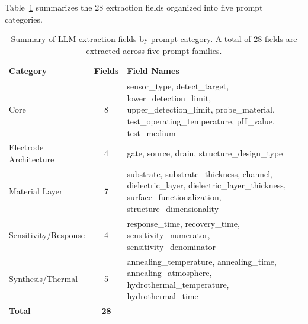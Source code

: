 Table~\ref{tab:extraction_fields} summarizes the 28 extraction fields organized into five prompt categories.

\begin{table}[htbp]
\centering
\caption{Summary of LLM extraction fields by prompt category. A total of 28 fields are extracted across five prompt families.}
\label{tab:extraction_fields}
\small
\begin{tabular}{lcp{12cm}}
\toprule
\textbf{Category} & \textbf{Fields} & \textbf{Field Names} \\
\midrule
Core & 8 & sensor\_type, detect\_target, lower\_detection\_limit, upper\_detection\_limit, probe\_material, test\_operating\_temperature, pH\_value, test\_medium \\
\addlinespace
Electrode Architecture & 4 & gate, source, drain, structure\_design\_type \\
\addlinespace
Material Layer & 7 & substrate, substrate\_thickness, channel, dielectric\_layer, dielectric\_layer\_thickness, surface\_functionalization, structure\_dimensionality \\
\addlinespace
Sensitivity/Response & 4 & response\_time, recovery\_time, sensitivity\_numerator, sensitivity\_denominator \\
\addlinespace
Synthesis/Thermal & 5 & annealing\_temperature, annealing\_time, annealing\_atmosphere, hydrothermal\_temperature, hydrothermal\_time \\
\midrule
\textbf{Total} & \textbf{28} & \\
\bottomrule
\end{tabular}
\end{table}
